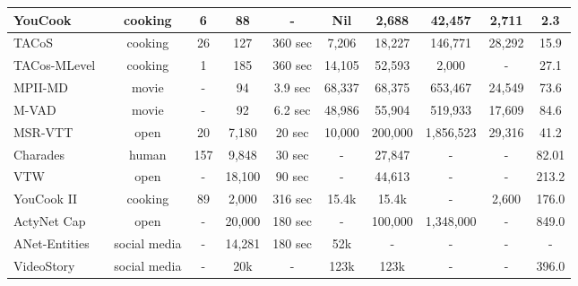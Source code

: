 \documentclass[10pt,journal,compsoc]{IEEEtran}
\begin{document}
\begin{table*}[t]
\begin{tabular}{|l|c|c|c|c|c|c|c|c|c|}
    \hline
    YouCook~\cite{das2013thousand} & cooking  & 6 & 88 & - & Nil & 2,688 & 42,457 & 2,711 & 2.3 \\
    \hline
    TACoS~\cite{regneri2013grounding} & cooking & 26 & 127 & 360 sec & 7,206 & 18,227 & 146,771 & 28,292 & 15.9 \\
    \hline
    TACos-MLevel~\cite{rohrbach2014coherent} & cooking & 1 & 185 & 360 sec & 14,105 & 52,593 & 2,000 & - & 27.1 \\
    \hline
    MPII-MD~\cite{rohrbach2015dataset} & movie & - & 94 & 3.9 sec & 68,337 & 68,375 & 653,467 & 24,549 & 73.6 \\
    \hline
    M-VAD~\cite{torabi2015using} & movie & - & 92 & 6.2 sec & 48,986 & 55,904 & 519,933 & 17,609 & 84.6 \\
    \hline
    MSR-VTT~\cite{xu2016msr} & open & 20 & 7,180 & 20 sec & 10,000 & 200,000 & 1,856,523 & 29,316 & 41.2 \\
    \hline
    Charades \cite{sigurdsson2016hollywood} & human & 157 & 9,848 & 30 sec & - & 27,847 & - & - & 82.01 \\
    \hline
    VTW~\cite{zeng2016generation} & open & - & 18,100 & 90 sec & - & 44,613 & - & - & 213.2 \\
    \hline
    YouCook II~\cite{zhou2018towards} & cooking & 89 & 2,000 & 316 sec & 15.4k & 15.4k & - & 2,600 & 176.0 \\
    \hline
    ActyNet Cap~\cite{krishna2017dense} & open & - & 20,000 & 180 sec & - & 100,000 & 1,348,000 & - & 849.0 \\
    \hline
    ANet-Entities~\cite{zhou2018grounded} & social media & - & 14,281 & 180 sec & 52k & - & - & - & - \\
    \hline
    VideoStory~\cite{gella2018dataset} & social media & - & 20k & - & 123k & 123k & - & - & 396.0 \\
    \hline
\end{tabular}
\label{tab:datasets}
\vspace{-5mm}
\end{table*}
\end{document}
